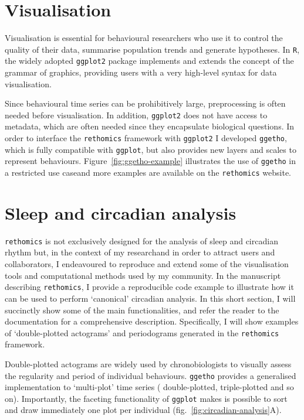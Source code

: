 \section{Visualisation}

Visualisation is essential for behavioural researchers who use it to control the quality of their data,
summarise population trends and generate hypotheses.
In \texttt{R}, the widely adopted \texttt{ggplot2}\cite{wickham_ggplot2_2016} package implements and extends the concept of the grammar of graphics\cite{wilkinson_grammar_2005}, providing users with a very high-level syntax for data visualisation.

Since behavioural time series can be prohibitively large, preprocessing is often needed before visualisation.
In addition, \texttt{ggplot2} does not have access to metadata, which are often needed since they encapsulate biological questions.
In order to interface the \texttt{rethomics} framework with \texttt{ggplot2} I developed \texttt{ggetho},
which is fully compatible with \texttt{ggplot}, but also provides new layers and scales to represent behaviours.
Figure~\ref{fig:ggetho-example} illustrates the use of \texttt{ggetho} in a restricted use case\emd{}and more examples are available on the \texttt{rethomics} website.



\section{Sleep and circadian analysis}

\texttt{rethomics} is not exclusively designed for the analysis of sleep and circadian rhythm
but, in the context of my research\emd{}and in order to attract users and collaborators\emd{}, I endeavoured to reproduce and extend some of the visualisation tools and computational methods used by my community.
In the manuscript describing \texttt{rethomics}, I provide a reproducible code example to illustrate how it can be used to perform `canonical' circadian analysis\cite{geissmann_rethomics_2018}.
In this short section, I will succinctly show some of the main functionalities, and refer the reader to the documentation for a comprehensive description.
Specifically, I will show examples of `double-plotted actograms' and periodograms generated in the \texttt{rethomics} framework.

Double-plotted actograms are widely used by chronobiologists to visually assess the regularity and period of individual behaviours.
\texttt{ggetho} provides a generalised implementation to `multi-plot' time series (\ie{} double-plotted, triple-plotted and so on).
Importantly, the faceting functionality of \texttt{ggplot} makes is possible to sort and draw immediately one plot per individual (fig.~\ref{fig:circadian-analysis}A).

